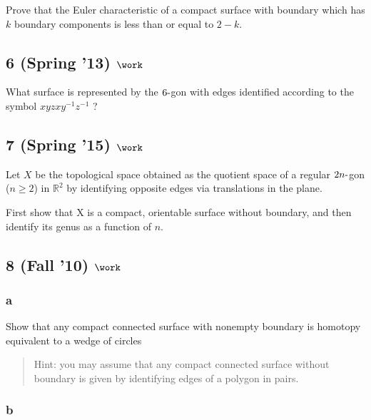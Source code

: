 Prove that the Euler characteristic of a compact surface with boundary
which has \(k\) boundary components is less than or equal to \(2 - k\).

\hypertarget{spring-13-work-4}{%
\subsection{\texorpdfstring{6 (Spring '13)
\(\work\)}{6 (Spring '13) \textbackslash work}}\label{spring-13-work-4}}

What surface is represented by the \(6{\hbox{-}}\)gon with edges
identified according to the symbol \(xyzxy^{-1}z^{-1}\) ?

\hypertarget{spring-15-work-4}{%
\subsection{\texorpdfstring{7 (Spring '15)
\(\work\)}{7 (Spring '15) \textbackslash work}}\label{spring-15-work-4}}

Let \(X\) be the topological space obtained as the quotient space of a
regular \(2n{\hbox{-}}\)gon (\(n \geq 2\)) in \({\mathbb{R}}^2\) by
identifying opposite edges via translations in the plane.

First show that X is a compact, orientable surface without boundary, and
then identify its genus as a function of \(n\).

\hypertarget{fall-10-work-2}{%
\subsection{\texorpdfstring{8 (Fall '10)
\(\work\)}{8 (Fall '10) \textbackslash work}}\label{fall-10-work-2}}

\hypertarget{a-23}{%
\subsubsection{a}\label{a-23}}

Show that any compact connected surface with nonempty boundary is
homotopy equivalent to a wedge of circles

\begin{quote}
Hint: you may assume that any compact connected surface without boundary
is given by identifying edges of a polygon in pairs.
\end{quote}

\hypertarget{b-23}{%
\subsubsection{b}\label{b-23}}

